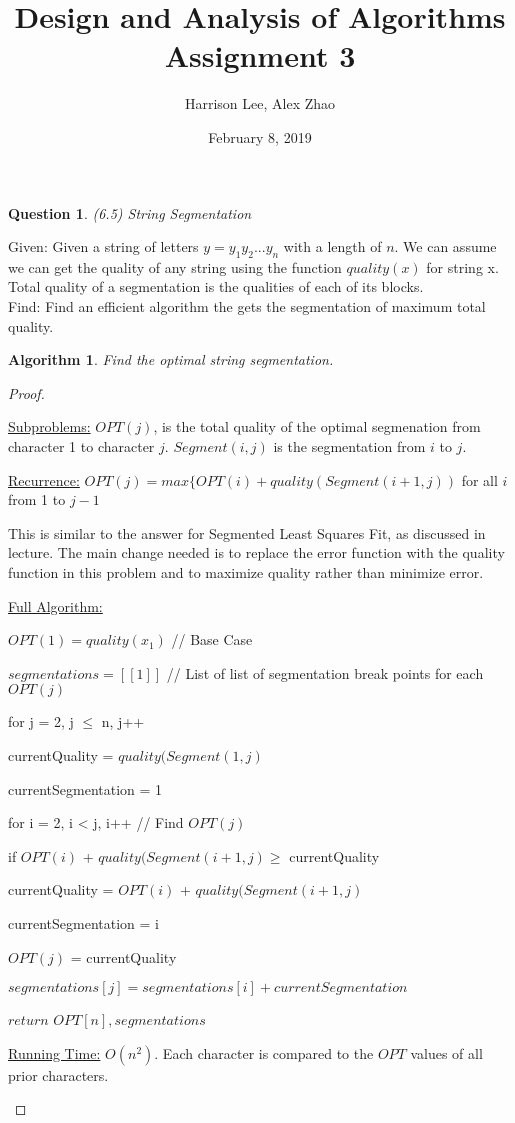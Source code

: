 \documentclass[11pt, oneside]{article}   	%
\title {Design and Analysis of Algorithms Assignment 3}
\author{Harrison Lee, Alex Zhao}
\date{February 8, 2019}
\newtheorem{Question}{Question}
\newtheorem{Algorithm}{Algorithm}
\begin{document}
\maketitle

\begin{Question} (6.5) String Segmentation%
\end{Question}

\noindent Given: Given a string of letters $y = y_1 y_2 ... y_n$ with a length of $n$. We can assume we can get the quality of any string using the function $quality(x)$ for string x. Total quality of a segmentation is the qualities of each of its blocks.\\

\noindent Find: Find an efficient algorithm the gets the segmentation of maximum total quality. \\

\begin{Algorithm}
Find the optimal string segmentation.
\end{Algorithm}

\begin{proof}
\begin{description}

\underline{Subproblems:} $OPT(j)$, is the total quality of the optimal segmenation from character 1 to character $j$. $Segment(i, j)$ is the segmentation from $i$ to $j$.

\underline{Recurrence:} $OPT(j) = max \{OPT(i) + quality(Segment(i+1, j))$ for all $i$ from 1 to $j-1$

This is similar to the answer for Segmented Least Squares Fit, as discussed in lecture. The main change needed is to replace the error function with the quality function in this problem and to maximize quality rather than minimize error.

\underline{Full Algorithm:}

$OPT(1) = quality(x_1)$    \quad // Base Case

$segmentations = [[1]]$	 \quad // List of list of segmentation break points for each $OPT(j)$

for j = 2, j $\leq$ n, j++

	\quad currentQuality = $quality(Segment(1, j)$

	\quad currentSegmentation = 1

	\quad for i = 2, i < j, i++ \quad // Find $OPT(j)$

	\quad \quad if $OPT(i)$ + $quality(Segment(i+1, j) \geq$  currentQuality

	\quad \quad \quad currentQuality = $OPT(i)$ + $quality(Segment(i+1, j)$

	\quad \quad \quad currentSegmentation = i

	\quad $OPT(j)$ = currentQuality

	\quad $segmentations[j] = segmentations[i] + currentSegmentation$

$return$ $OPT[n], segmentations$

\underline{Running Time:} $O(n^2)$. Each character is compared to the $OPT$ values of all prior characters.

\end{description}
\end{proof}
\end{document}
